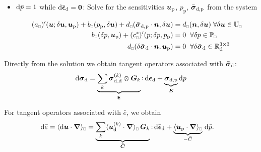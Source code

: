 \documentclass{bmcart}
\DeclarePairedDelimiter{\homgen}{\langle}{\rangle_\rve}
\renewcommand{\dev}{\mathrm{d}}
\newcommand{\ded}{\mathrm{d}}
\newcommand{\dep}{\mathrm{p}}
\newcommand{\rve}{
  {\mathchoice
   {\mbox{\scalebox{0.67}{$\Box$}}}
   {\mbox{\scalebox{0.67}{$\Box$}}}
   {\mbox{\scalebox{0.5}{$\Box$}}}
   {\mbox{\scalebox{0.375}{$\Box$}}}
  }
}
\begin{document}
\begin{itemize}
\item $\operatorname{d \!}\bar{p} = 1$ while $\dif\bar{\ts\epsilon}_\dev = \ts 0$: Solve for the sensitivities $\ta u_\dep$, $p_\dep$, $\bar{\ts\sigma}_{\dev,\dep}$ from the system 
\end{itemize}
\begin{subequations}\label{eq:n_sensitivities_p}
\begin{align}
    (a_\rve)'(\ta{u};\delta\ta{u}, \ta u_\dep) + b_\rve(p_\dep,\delta\ta{u}) +  d_\rve(\bar{\ts\sigma}_{\dev,\dep}\cdot\ta n,\delta\ta{u}) &= d_\rve(\ta n, \delta\ta u)
    \; \forall \delta\ta{u} \in \set{U}_\rve\hspace{-2em}
\\
    \hspace{2em}b_\rve(\delta p,\ta u_\dep) + (c^*_\rve)'(p;\delta p, p_\dep) &= 0
    \;\; \forall \delta p \in \set{P}_\rve
\\
    d_\rve(\delta\bar{\ts\sigma}_\dev\cdot\ta n,\ta u_\dep) &= 0
    \;\; \forall \delta\bar{\ts\sigma}_\dev \in\set{R}^{3\times3}_\dev
\end{align}
\end{subequations}

Directly from the solution we obtain tangent operators associated with $\bar{\ts\sigma}_\dev$:
\begin{align}
 \dif\bar{\ts\sigma}_\dev = \underbrace{\sum_k \bar{\ts\sigma}_{\dev,\ded}^{(k)} \outerp \ts G_k }_{\bar{\tf E}}\dprod \dif\bar{\ts\epsilon}_\dev + \underbrace{\bar{\ts\sigma}_{\dev,\dep}}_{\bar{\ts E}} \dif\bar{p}
\end{align}

For tangent operators associated with $\bar{e}$, we obtain
\begin{align}
    \dif\bar{e}
    & = \homgen{\dif \ta u\cdot \diff}
    = \underbrace{\sum_k \homgen{\ta u_\ded^{(k)}\cdot\diff}\,\ts G_k}_{\bar{\ts C}} \dprod\dif\bar{\ts\epsilon}_\dev + 
      \underbrace{\homgen{\ta u_\dep\cdot\diff}}_{-\bar{C}}\,\dif\bar{p}.
\end{align}



\end{document}
